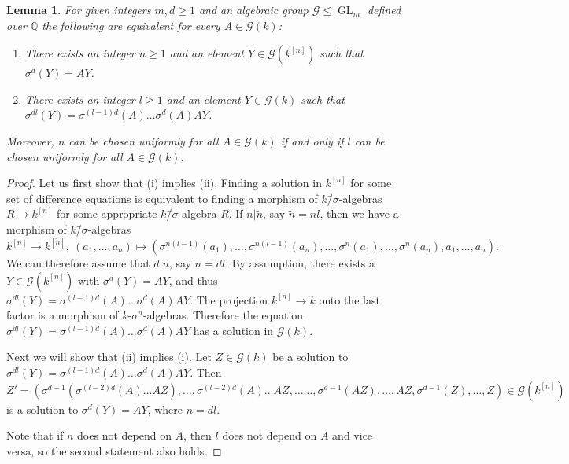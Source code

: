 \documentclass[oneside,reqno]{amsart}
\newtheorem{lemma}[theo]{Lemma}
\theoremstyle{definition}
\newcommand{\G}{\mathcal{G}}
\newcommand{\Gl}{\operatorname{GL}}
\newcommand{\s}{\sigma}
\newcommand{\ks}{$k$\=/$\s$}
\newcommand{\kn}{k^{[n]}}
\begin{document}
\begin{lemma}\label{lemma: on pt (b)}
	For given integers $m,d\geq 1$ and an algebraic group $\G\leq \Gl_m$ defined over $\mathbb{Q}$  the following are equivalent for every $A\in \G(k)$:
	\begin{enumerate}
		\item There exists an integer $n\geq 1$ and an element $Y\in \G(\kn)$ such that $\s^d(Y)=AY$.
		\item There exists an integer $l\geq 1$ and an element $Y\in \G(k)$ such that $\s^{dl}(Y)=\s^{(l-1)d}(A)\ldots\s^d(A)AY$.
	\end{enumerate}
	Moreover, $n$ can be chosen uniformly for all $A\in \G(k)$ if and only if $l$ can be chosen uniformly for all $A \in \G(k)$. 
\end{lemma}

\begin{proof}
	Let us first show that (i) implies (ii).
	Finding a solution in $\kn$ for some set of difference equations is equivalent to finding a morphism of \ks-algebras $R\to \kn$ for some appropriate \ks-algebra $R$. If $n|\tilde n$, say $\tilde n=nl$, then we have a morphism of \ks-algebras $$\kn\to k^{[\tilde n]},\ (a_1,\ldots,a_n)\mapsto (\s^{n(l-1)}(a_1),\ldots,\s^{n(l-1)}(a_n),\ldots,\s^n(a_1),\ldots,\s^n(a_n),a_1,\ldots,a_n).$$ We can therefore assume that $d|n$, say $n=dl$. By assumption, there exists a $Y\in \G(k^{[n]})$ with $\s^d(Y)=AY$, and thus $\s^{dl}(Y)=\s^{(l-1)d}(A)\ldots\s^d(A)AY$.
	The projection $\kn\to k$ onto the last factor is a morphism of $k$-$\s^n$-algebras. Therefore the equation 
	$\s^{dl}(Y)=\s^{(l-1)d}(A)\ldots\s^d(A)AY$ has a solution in $\G(k)$. 
	
	Next we will show that (ii) implies (i). Let $Z\in\G(k)$ be a solution to $\s^{dl}(Y)=\s^{(l-1)d}(A)\ldots\s^d(A)AY$. Then
	$$Z'=(\s^{d-1}(\s^{(l-2)d}(A)\ldots AZ),\ldots,\s^{(l-2)d}(A)\ldots AZ,\ldots\ldots,\s^{d-1}(AZ),\ldots,AZ,\s^{d-1}(Z),\ldots,Z)\in\G(\kn)$$
	is a solution to $\s^d(Y)=AY$, where $n=dl$.
	
	Note that if $n$ does not depend on $A$, then $l$ does not depend on $A$ and vice versa, so the second statement also holds. 
\end{proof}
\end{document}
